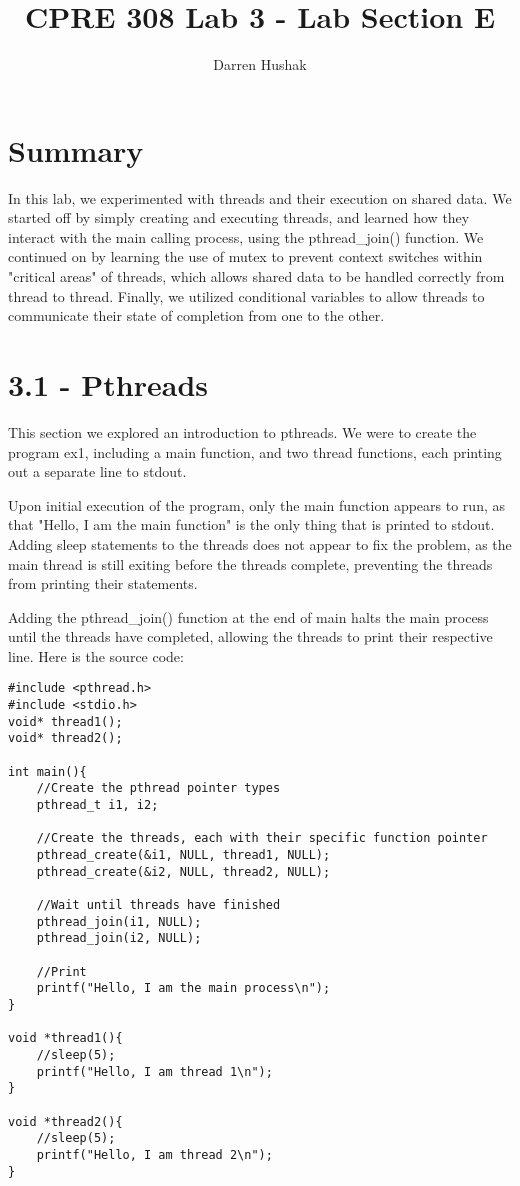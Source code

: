 \documentclass[11pt]{report}
\author{Darren Hushak}
\title{CPRE 308 Lab 3 - Lab Section E}
\date{}
\begin{document}
\maketitle
\section*{Summary}
In this lab, we experimented with threads and their execution on shared data. We started off by simply creating and executing threads, and learned how they interact with the main calling process, using the pthread\_join() function.
We continued on by learning the use of mutex to prevent context switches within "critical areas" of threads, which allows shared data to be handled correctly from thread to thread.
Finally, we utilized conditional variables to allow threads to communicate their state of completion from one to the other.
\newpage
\section*{3.1 - Pthreads}
This section we explored an introduction to pthreads. We were to create the program ex1, including a main function, and two thread functions, each printing out a separate line to stdout.
\newline

Upon initial execution of the program, only the main function appears to run, as that "Hello, I am the main function" is the only thing that is printed to stdout. Adding sleep statements to the threads does not appear to fix the problem, as the main thread is still exiting before the threads complete, preventing the threads from printing their statements.
\newline

Adding the pthread\_join() function at the end of main halts the main process until the threads have completed, allowing the threads to print their respective line.
\newpage
Here is the source code:
\begin{lstlisting}
#include <pthread.h>
#include <stdio.h>
void* thread1();
void* thread2();

int main(){
	//Create the pthread pointer types
	pthread_t i1, i2;
	
	//Create the threads, each with their specific function pointer
	pthread_create(&i1, NULL, thread1, NULL);
	pthread_create(&i2, NULL, thread2, NULL);
	
	//Wait until threads have finished
	pthread_join(i1, NULL);
	pthread_join(i2, NULL);
	
	//Print
	printf("Hello, I am the main process\n");
}

void *thread1(){
	//sleep(5);
	printf("Hello, I am thread 1\n");
}

void *thread2(){
	//sleep(5);
	printf("Hello, I am thread 2\n");
}
\end{lstlisting}
\end{document}
